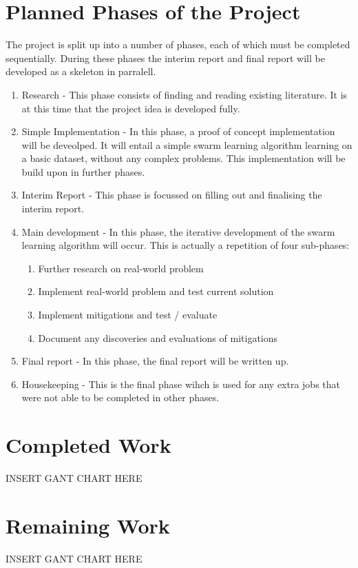 \documentclass[12pt,a4paper,titlepage]{report}
\begin{document}
	\section{Planned Phases of the Project}
	The project is split up into a number of phases, each of which must be completed sequentially. During these phases the interim report and final report will be developed as a skeleton in parralell.
	\begin{enumerate}
		\item Research - This phase consists of finding and reading existing literature. It is at this time that the project idea is developed fully.
		\item Simple Implementation - In this phase, a proof of concept implementation will be deveolped. It will entail a simple swarm learning algorithm learning on a basic dataset, without any complex problems. This implementation will be build upon in further phases.
		\item Interim Report - This phase is focussed on filling out and finalising the interim report.
		\item Main development - In this phase, the iterative development of the swarm learning algorithm will occur. This is actually a repetition of four sub-phases:
		\begin{enumerate}
			\item Further research on real-world problem
			\item Implement real-world problem and test current solution
			\item Implement mitigations and test / evaluate
			\item Document any discoveries and evaluations of mitigations
		\end{enumerate}
		\item Final report - In this phase, the final report will be written up.
		\item Housekeeping - This is the final phase wihch is used for any extra jobs that were not able to be completed in other phases.
	\end{enumerate}
	\section{Completed Work}
	INSERT GANT CHART HERE
	\section{Remaining Work}
	INSERT GANT CHART HERE
	
	
	{}
\end{document}
